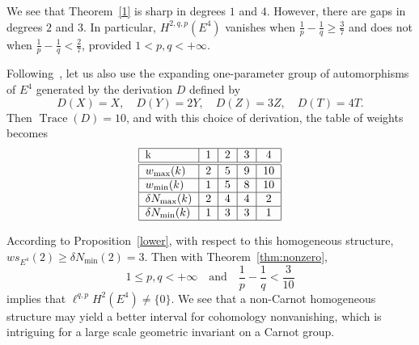 \documentclass[11pt]{article}
\theoremstyle{definition}
\numberwithin{equation}{section}
\numberwithin{figure}{section}
\numberwithin{table}{section}
\DeclareMathOperator{\trace}{Trace}
\begin{document}
We see that Theorem~\ref{1} is sharp in degrees $1$ and $4$. However, there are gaps in degrees $2$ and $3$. In particular, $H^{2,q,p}(E^4)$ vanishes when $\frac{1}{p}- \frac{1}{q} \geq \frac{3}{7}$ and does not when $\frac{1}{p}- \frac{1}{q} < \frac{2}{7}$, provided $1<p, q< +\infty$.

Following~\cite[Section~4.2]{Rumin_TSG}, let us also use the expanding one-parameter group of automorphisms of $E^4$ generated by the derivation $D$ defined by
\[
D(X)=X,\quad D(Y)=2Y,\quad D(Z)=3Z,\quad D(T)= 4T.
\]
Then $\trace(D)=10$, and with this choice of derivation, the table of weights becomes
\[
\begin{tabular}{|l|c|c|c|c|}
\hline k & 1 & 2 & 3 & 4 \\
\hline\hline $w_{\max}(k)$ & 2 & 5 & 9 & 10 \\
\hline $w_{\min}(k)$ & 1 & 5 & 8 & 10 \\
\hline $\delta N_{\max}(k)$ & 2 & 4 & 4 & 2 \\
\hline $\delta N_{\min}(k)$ & 1 & 3 & 3 & 1 \\
\hline
\end{tabular}
\]

According to Proposition~\ref{lower}, with respect to this homogeneous structure, $ws_{E^4}(2)\geq \delta N_{\min}(2)=3$. Then with Theorem~\ref{thm:nonzero},
\[
1\leq p,q<+\infty \quad \text{and} \quad \frac{1}{p}-
\frac{1}{q}<\frac{3}{10}
\]
implies that $\ell^{q,p}H^2(E^4)\not= \{0\}$. We see that a non-Carnot homogeneous structure may yield a better interval for cohomology nonvanishing, which is intriguing for a large scale geometric invariant on a Carnot group.
\end{document}
